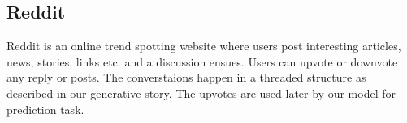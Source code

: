 \subsection{Reddit}
Reddit is an online trend spotting website where users post interesting
articles, news, stories, links etc. and a discussion ensues. Users can upvote or
downvote any reply or posts. The converstaions happen in a threaded structure as
described in our generative story. The upvotes are used later by our model for
prediction task. 

